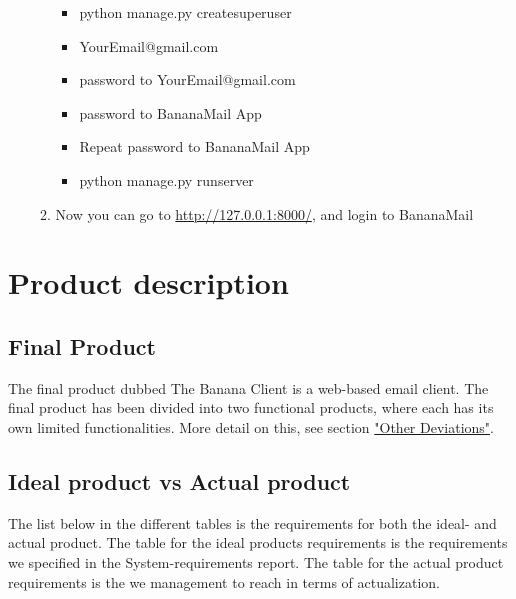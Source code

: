 \documentclass{article}
\begin{document}
\begin{itemize}
\begin{enumerate}
\begin{itemize}
        \item python manage.py createsuperuser
        
        \item {YourEmail}@gmail.com
        
        \item password to {YourEmail}@gmail.com
        
        \item password to BananaMail App
        
        \item Repeat password to BananaMail App
        
        \item python manage.py runserver
        \end{itemize}
        
        \item Now you can go to \url{http://127.0.0.1:8000/}, and login to BananaMail

    \end{enumerate}
\end{itemize}

\newpage

\section*{Product description}

\subsection*{Final Product}
The final product dubbed The Banana Client is a web-based email client. The final product has been divided into two functional products, where each has its own limited functionalities. More detail on this, see section \hyperref[sec:deviations]{"Other Deviations"}.

\subsection*{Ideal product vs Actual product}
The list below in the different tables is the requirements for both the ideal- and actual product. The table for the ideal products requirements is the requirements we specified in the System-requirements report. The table for the actual product requirements is the we management to reach in terms of actualization.
\end{document}
